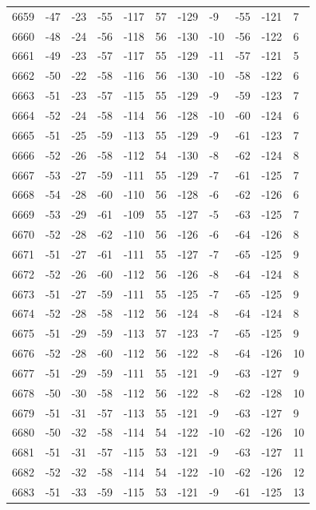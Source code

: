 \begin{table}[H]
\begin{tabular}{lllllllllll}
6659 & -47 & -23 & -55 & -117 & 57 & -129 & -9 & -55 & -121 & 7 \\
6660 & -48 & -24 & -56 & -118 & 56 & -130 & -10 & -56 & -122 & 6 \\
6661 & -49 & -23 & -57 & -117 & 55 & -129 & -11 & -57 & -121 & 5 \\
6662 & -50 & -22 & -58 & -116 & 56 & -130 & -10 & -58 & -122 & 6 \\
6663 & -51 & -23 & -57 & -115 & 55 & -129 & -9 & -59 & -123 & 7 \\
6664 & -52 & -24 & -58 & -114 & 56 & -128 & -10 & -60 & -124 & 6 \\
6665 & -51 & -25 & -59 & -113 & 55 & -129 & -9 & -61 & -123 & 7 \\
6666 & -52 & -26 & -58 & -112 & 54 & -130 & -8 & -62 & -124 & 8 \\
6667 & -53 & -27 & -59 & -111 & 55 & -129 & -7 & -61 & -125 & 7 \\
6668 & -54 & -28 & -60 & -110 & 56 & -128 & -6 & -62 & -126 & 6 \\
6669 & -53 & -29 & -61 & -109 & 55 & -127 & -5 & -63 & -125 & 7 \\
6670 & -52 & -28 & -62 & -110 & 56 & -126 & -6 & -64 & -126 & 8 \\
6671 & -51 & -27 & -61 & -111 & 55 & -127 & -7 & -65 & -125 & 9 \\
6672 & -52 & -26 & -60 & -112 & 56 & -126 & -8 & -64 & -124 & 8 \\
6673 & -51 & -27 & -59 & -111 & 55 & -125 & -7 & -65 & -125 & 9 \\
6674 & -52 & -28 & -58 & -112 & 56 & -124 & -8 & -64 & -124 & 8 \\
6675 & -51 & -29 & -59 & -113 & 57 & -123 & -7 & -65 & -125 & 9 \\
6676 & -52 & -28 & -60 & -112 & 56 & -122 & -8 & -64 & -126 & 10 \\
6677 & -51 & -29 & -59 & -111 & 55 & -121 & -9 & -63 & -127 & 9 \\
6678 & -50 & -30 & -58 & -112 & 56 & -122 & -8 & -62 & -128 & 10 \\
6679 & -51 & -31 & -57 & -113 & 55 & -121 & -9 & -63 & -127 & 9 \\
6680 & -50 & -32 & -58 & -114 & 54 & -122 & -10 & -62 & -126 & 10 \\
6681 & -51 & -31 & -57 & -115 & 53 & -121 & -9 & -63 & -127 & 11 \\
6682 & -52 & -32 & -58 & -114 & 54 & -122 & -10 & -62 & -126 & 12 \\
6683 & -51 & -33 & -59 & -115 & 53 & -121 & -9 & -61 & -125 & 13 \\

\end{tabular}
\end{table}
